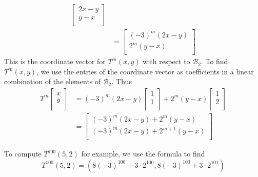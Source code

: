 \documentclass{article}
\begin{document}
\begin{example}
\begin{align*}
\begin{bmatrix}
      2x - y \\
      y - x  \\
    \end{bmatrix}                          \\
                                  & =
    \begin{bmatrix}
      (-3)^m (2x - y) \\
      2^m (y - x)     \\
    \end{bmatrix}
  \end{align*}
  This is the coordinate vector for $T^m(x, y)$ with respect to $\mathcal{B}_2$. To find $T^m(x, y)$, we use the entries of the coordinate vector as coefficients in a linear combination of the elements of $\mathcal{B}_2$. Thus
  \begin{align*}
    T^m
    \begin{bmatrix}
      x \\y\\
    \end{bmatrix} & = (-3)^m(2x - y)
    \begin{bmatrix}
      1 \\1\\
    \end{bmatrix} + 2^m (y - x)
    \begin{bmatrix}
      1 \\2\\
    \end{bmatrix}                   \\
                    & =
    \begin{bmatrix}
      (-3)^m (2x - y) + 2^m(y-x)     \\
      (-3)^m (2x - y) + 2^{m+1}(y-x) \\
    \end{bmatrix}
  \end{align*}

  To compute $T^{100}(5, 2)$ for example, we use the formula to find \[
    T^{100}(5, 2) = (8(-3)^{100} + 3 \cdot 2^{100}, 8(-3)^{100} + 3 \cdot 2^{101})
  \]
\end{example}
\end{document}
